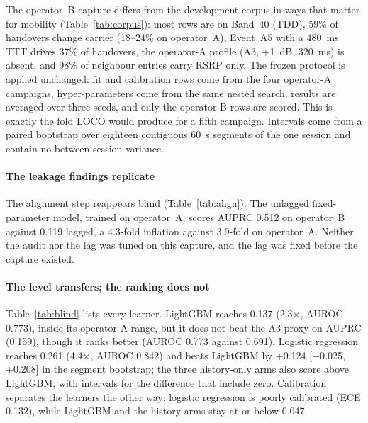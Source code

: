 \documentclass[preprint,review,12pt]{elsarticle}\usepackage{lineno}\linenumbers
\newcommand{\x}{$\times$}
\begin{document}
The operator~B capture differs from the development corpus in ways that matter for mobility (Table~\ref{tab:corpus}): most rows are on Band~40 (TDD), 59\% of handovers change carrier (18--24\% on operator~A), Event~A5 with a 480~ms TTT drives 37\% of handovers, the operator-A profile (A3, +1~dB, 320~ms) is absent, and 98\% of neighbour entries carry RSRP only. The frozen protocol is applied unchanged: fit and calibration rows come from the four operator-A campaigns, hyper-parameters come from the same nested search, results are averaged over three seeds, and only the operator-B rows are scored. This is exactly the fold LOCO would produce for a fifth campaign. Intervals come from a paired bootstrap over eighteen contiguous 60~s segments of the one session and contain no between-session variance.

\paragraph{The leakage findings replicate} The alignment step reappears blind (Table~\ref{tab:align}). The unlagged fixed-parameter model, trained on operator~A, scores AUPRC 0.512 on operator~B against 0.119 lagged, a 4.3-fold inflation against 3.9-fold on operator~A. Neither the audit nor the lag was tuned on this capture, and the lag was fixed before the capture existed.

\paragraph{The level transfers; the ranking does not} Table~\ref{tab:blind} lists every learner. LightGBM reaches 0.137 (2.3\x, AUROC 0.773), inside its operator-A range, but it does not beat the A3 proxy on AUPRC (0.159), though it ranks better (AUROC 0.773 against 0.691). Logistic regression reaches 0.261 (4.4\x, AUROC 0.842) and beats LightGBM by +0.124 [+0.025, +0.208] in the segment bootstrap; the three history-only arms also score above LightGBM, with intervals for the difference that include zero. Calibration separates the learners the other way: logistic regression is poorly calibrated (ECE 0.132), while LightGBM and the history arms stay at or below 0.047.
\end{document}
